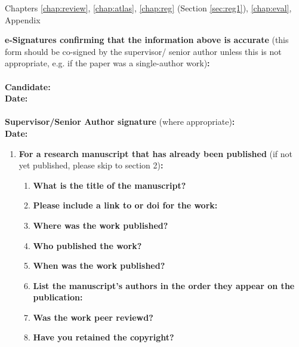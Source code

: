 {\begin{enumerate}[leftmargin=*,label={\bfseries\arabic*.}]
Chapters \ref{chap:review}, \ref{chap:atlas}, \ref{chap:reg} (Section \ref{sec:reg1}), \ref{chap:eval}, Appendix
\end{enumerate}

\textbf{e-Signatures confirming that the information above is accurate}
(this form should be co-signed by the supervisor/ senior author unless this is not appropriate, e.g. if the paper was a single-author work)\textbf{:}\\
\textbf{}\\
\textbf{Candidate:}\\
\textbf{Date:}\\
\textbf{}\\
\textbf{Supervisor/Senior Author signature} (where appropriate)\textbf{:}\\
\textbf{Date:}
%

\newpage
\begin{enumerate}[leftmargin=*,label={\bfseries\arabic*.}]\itemsep0em
	\item \textbf{For a research manuscript that has already been published} (if not yet published, please skip to section 2)\textbf{:}
	\begin{enumerate}[label={\alph*)}]\itemsep0em
	\item \textbf{What is the title of the manuscript?}

	\item \textbf{Please include a link to or doi for the work:}

	\item \textbf{Where was the work published?}

	\item \textbf{Who published the work?}

	\item \textbf{When was the work published?}

	\item \textbf{List the manuscript's authors in the order they appear on the publication:}

	\item \textbf{Was the work peer reviewd?}

	\item \textbf{Have you retained the copyright?}


\end{enumerate}
\end{enumerate}}
